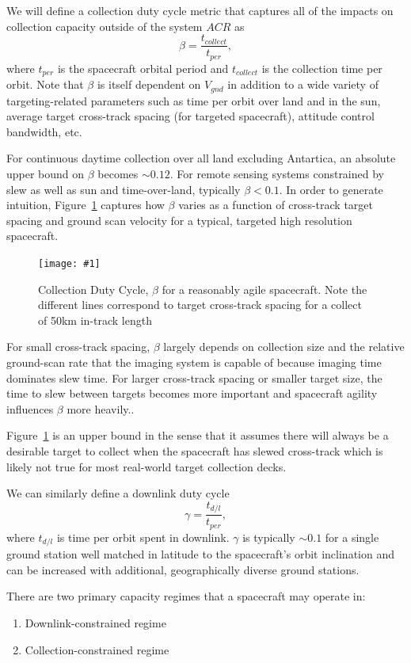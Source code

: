 \documentclass[10pt,journal]{IEEEtran}  %
\newcommand{\includefigure}[3]
{
  \begin{figure}[h!]
  \centering
  \texttt{[image: \#1]}
  \caption[]{#3}
  \label{#2}
  \end{figure}
}
\begin{document}
We will define a collection duty cycle metric that captures all of the impacts on collection capacity outside of the system $ACR$ as
\begin{equation}
    \beta = \frac{t_{collect}}{t_{per}},
\end{equation} 
where $t_{per}$ is the spacecraft orbital period and $t_{collect}$ is the collection time per orbit.  Note that $\beta$ is itself dependent on $V_{gnd}$ in addition to a wide variety of targeting-related parameters such as time per orbit over land and in the sun, average target cross-track spacing (for targeted spacecraft), attitude control bandwidth, etc.

For continuous daytime collection over all land excluding Antartica, an absolute upper bound on $\beta$ becomes $\sim 0.12$.  For remote sensing systems constrained by slew as well as sun and time-over-land, typically $\beta < 0.1$.  In order to generate intuition, Figure~\ref{fig:beta} captures how $\beta$ varies as a function of cross-track target spacing and ground scan velocity for a typical, targeted high resolution spacecraft.

\includefigure{figures/collection_dc.pgf}{fig:beta}{Collection Duty Cycle, $\beta$ for a reasonably agile spacecraft.  Note the different lines correspond to target cross-track spacing for a collect of 50km in-track length}

For small cross-track spacing, $\beta$ largely depends on collection size and the relative ground-scan rate that the imaging system is capable of because imaging time dominates slew time.  For larger cross-track spacing or smaller target size, the time to slew between targets becomes more important and spacecraft agility influences $\beta$ more heavily..

Figure~\ref{fig:beta} is an upper bound in the sense that it assumes there will always be a desirable target to collect when the spacecraft has slewed cross-track which is likely not true for most real-world target collection decks.  

We can similarly define a downlink duty cycle
\begin{equation}
    \gamma = \frac{t_{d/l}}{t_{per}},
\end{equation}
where $t_{d/l}$ is time per orbit spent in downlink.  $\gamma$ is typically $\sim 0.1$ for a single ground station well matched in latitude to the spacecraft's orbit inclination and can be increased with additional, geographically diverse ground stations.

There are two primary capacity regimes that a spacecraft may operate in:
\begin{enumerate}
\item Downlink-constrained regime
\item Collection-constrained regime
\end{enumerate}
\end{document}
